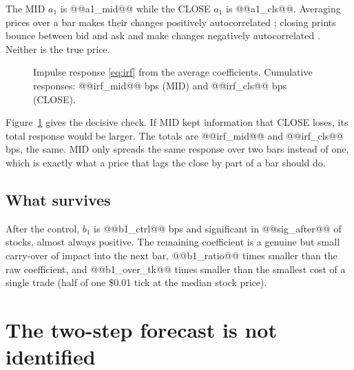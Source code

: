 \documentclass[11pt,a4paper]{article}
\begin{document}
The MID $a_1$ is @@a1_mid@@ while the CLOSE $a_1$ is @@a1_cls@@. Averaging prices over a bar makes their
changes positively autocorrelated \citep{working1960}; closing prints bounce between bid and ask and
make changes negatively autocorrelated \citep{roll1984}. Neither is the true price.

\begin{figure}[htbp]
\centering
{}
\caption{Impulse response \eqref{eq:irf} from the average coefficients. Cumulative responses:
@@irf_mid@@ bps (MID) and @@irf_cls@@ bps (CLOSE).}
\label{fig:irf}
\end{figure}

Figure~\ref{fig:irf} gives the decisive check. If MID kept information that CLOSE loses, its total response
would be larger. The totals are @@irf_mid@@ and @@irf_cls@@ bps, the same. MID only spreads the same
response over two bars instead of one, which is exactly what a price that lags the close by part of a
bar should do.

\subsection{What survives}

After the control, $b_1$ is @@b1_ctrl@@ bps and significant in @@sig_after@@ of stocks, almost always positive. The remaining coefficient is a genuine but small carry-over of impact into the next bar, @@b1_ratio@@ times smaller
than the raw coefficient, and @@b1_over_tk@@ times smaller than the smallest cost of a single trade
(half of one \$0.01 tick at the median stock price).

\section{The two-step forecast is not identified}
\label{sec:twostep}
\end{document}
